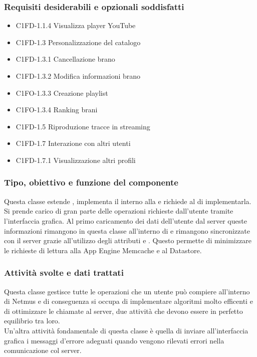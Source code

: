 \subsubsection*{Requisiti desiderabili e opzionali soddisfatti}
\begin{itemize}
    \item C1FD-1.1.4 Visualizza player YouTube
    \item C1FD-1.3 Personalizzazione del catalogo 
    \item C1FD-1.3.1 Cancellazione brano
    \item C1FD-1.3.2 Modifica informazioni brano
    \item C1FO-1.3.3 Creazione playlist
    \item C1FO-1.3.4 Ranking brani
    \item C1FD-1.5 Riproduzione tracce in streaming
    \item C1FD-1.7 Interazione con altri utenti
    \item C1FD-1.7.1 Visualizzazione altri profili
\end{itemize}
\subsubsection*{Tipo, obiettivo e funzione del componente}
Questa classe estende , implementa il 
interno alla  e richiede al  di
implementarla.\\
 Si prende carico di gran parte delle operazioni richieste
dall'utente tramite l'interfaccia grafica. Al primo caricamento dei dati
dell'utente dal server queste informazioni rimangono in questa classe
all'interno di  e rimangono sincronizzate con il
server grazie all'utilizzo degli attributi  e
. Questo permette di minimizzare le richieste di
lettura alla App Engine Memcache e al Datastore. 
\subsubsection*{Attivit\`a svolte e dati trattati} Questa classe gestisce tutte
le operazioni che un utente pu\`o compiere all'interno di Netmus e di
conseguenza si occupa di implementare algoritmi molto efficenti e
di ottimizzare le chiamate al server, due attivit\`a che devono essere in
perfetto equilibrio tra loro.\\
Un'altra attivit\`a fondamentale di questa classe \`e quella di inviare
all'interfaccia grafica i messaggi d'errore adeguati quando vengono rilevati
errori nella comunicazione col server.

